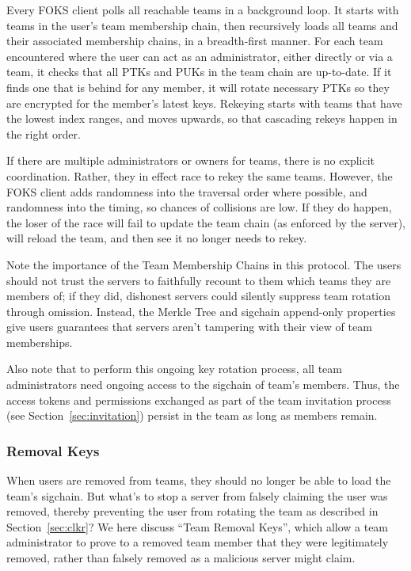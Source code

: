 Every FOKS client polls all reachable teams in a background loop. It starts 
with teams in the user's team membership chain, then recursively loads all teams
and their associated membership chains, in a breadth-first manner.  For each
team encountered where the user can act as an administrator, either directly or
via a team, it checks that all PTKs and PUKs in the team chain are up-to-date.
If it finds one that is behind for any member, it will rotate necessary PTKs so
they are encrypted for the member's latest keys. Rekeying starts with teams
that have the lowest index ranges, and moves upwards, so that cascading rekeys
happen in the right order.

If there are multiple administrators or owners for teams, there is no explicit
coordination. Rather, they in effect race to rekey the same teams.  However, the
FOKS client adds randomness into the traversal order where possible, and
randomness into the timing, so chances of collisions are low. If they do happen,
the loser of the race will fail to update the team chain (as enforced by the
server), will reload the team, and then see it no longer needs to rekey.

Note the importance of the Team Membership Chains in this protocol. The
users should not trust the servers to faithfully recount to them which
teams they are members of; if they did, dishonest servers could silently
suppress team rotation through omission. Instead, the Merkle Tree and sigchain
append-only properties give users guarantees that servers aren't tampering
with their view of team memberships.

Also note that to perform this ongoing key rotation process, all team
administrators need ongoing access to the sigchain of team's members. Thus, the
access tokens and permissions exchanged as part of the team invitation process
(see Section~\ref{sec:invitation}) persist in the team as long as members
remain.

\subsubsection{Removal Keys}
\label{sec:removal-keys}

When users are removed from teams, they should no longer be able to load the team's
sigchain. But what's to stop a server from falsely claiming the user was removed, thereby 
preventing the user from rotating the team as described in Section~\ref{sec:clkr}?
We here discuss ``Team Removal Keys'', which allow a team administrator to prove
to a removed team member that they were legitimately removed, rather than falsely
removed as a malicious server might claim.

